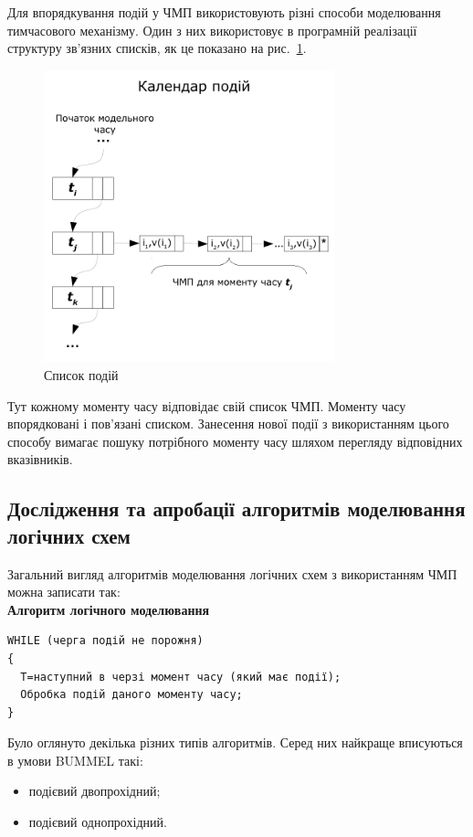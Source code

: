 \documentclass[12pt,a4paper]{article}
\begin{document}
Для впорядкування подій у ЧМП використовують різні способи моделювання тимчасового механізму. Один з них використовує в програмній реалізації структуру зв'язних списків, як це показано на рис.~\ref{feqCalendar}.

\begin{figure}[h]
  \centering
    \includegraphics[width=0.75\textwidth]{events-calendar}
  \caption{Список подій}\label{feqCalendar}
\end{figure}

Тут кожному моменту часу відповідає свій список ЧМП. Моменту часу впорядковані і пов'язані списком. Занесення нової події з використанням цього способу вимагає пошуку потрібного моменту часу шляхом перегляду відповідних вказівників.

\subsection{Дослідження та апробації алгоритмів моделювання логічних схем}

Загальний вигляд алгоритмів моделювання логічних схем з використанням ЧМП можна записати так:\\
\textbf{Алгоритм логічного моделювання}
\small\begin{verbatim}
WHILE (черга подій не порожня)
{
  T=наступний в черзі момент часу (який має події);
  Обробка подій даного моменту часу;
}
\end{verbatim}\normalsize

Було оглянуто декілька різних типів алгоритмів. Серед них найкраще вписуються в умови BUMMEL такі:
\begin{itemize}
  \item подієвий двопрохідний;
  \item подієвий однопрохідний.
\end{itemize}
\end{document}
